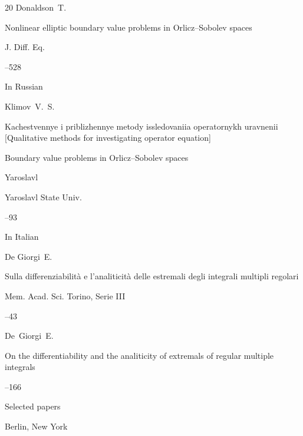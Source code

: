 \begin{thebibliography}{20}
\by  Donaldson~T.

\paper Nonlinear elliptic boundary value problems in Orlicz--Sobolev spaces

\jour J. Diff. Eq.




--528





\lang In Russian

\by Klimov~V.~S.

\inbook  Kachestvennye i priblizhennye metody issledovaniia operatornykh uravnenii \rm [Qualitative methods for investigating operator equation]

\paper Boundary value problems in Orlicz--Sobolev spaces

\publaddr Yaroslavl

\publ Yaroslavl State Univ.


--93






\lang In Italian

\by  De Giorgi~E.

\paper Sulla differenziabilit\`a e l'analiticit\`a delle estremali degli integrali multipli regolari

\jour Mem. Acad. Sci. Torino, Serie III



--43



\transl

\by  De~Giorgi~E.

\paper On the differentiability and the analiticity of extremals of regular multiple integrals

--166


\inbook Selected papers

\publaddr Berlin, New York


\end{thebibliography}

